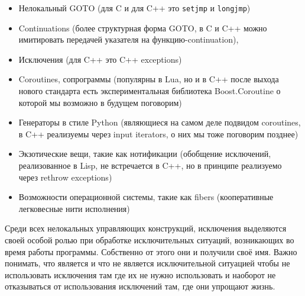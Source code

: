 \documentclass[a4paper,12pt,oneside]{article}
\begin{document}
\begin{itemize}
\item
Нелокальный GOTO (для C и для C++ это \lstinline!setjmp! и \lstinline!longjmp!)
\item
Continuations (более структурная форма GOTO, в C и C++ можно имитировать передачей указателя на функцию-continuation), 
\item
Исключения (для C++ это C++ exceptions)
\item
Coroutines, сопрограммы (популярны в Lua, но и в C++ после выхода нового стандарта есть экспериментальная библиотека Boost.Coroutine о которой мы возможно в будущем поговорим)
\item
Генераторы в стиле Python (являющиеся на самом деле подвидом coroutines, в C++ реализуемы через input iterators, о них мы тоже поговорим позднее)
\item
Экзотические вещи, такие как нотификации (обобщение исключений, реализованное в Lisp, не встречается в C++, но в принципе реализуемо через rethrow exceptions)
\item
Возможности операционной системы, такие как fibers (кооперативные легковесные нити исполнения)
\end{itemize}

Среди всех нелокальных управляющих конструкций, исключения выделяются своей особой ролью при обработке исключительных ситуаций, возникающих во время работы программы. Собственно от этого они и получили своё имя. Важно понимать, что является и что не является исключительной ситуацией чтобы не использовать исключения там где их не нужно использовать и наоборот не отказываться от использования исключений там, где они упрощают жизнь.
\end{document}
